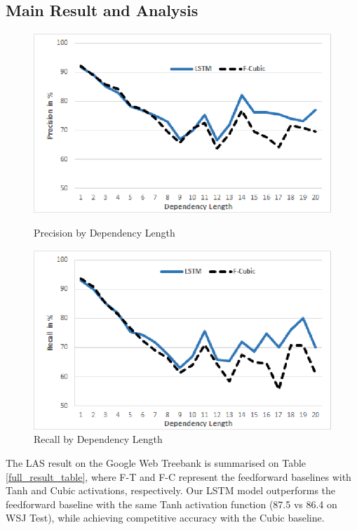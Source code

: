 \subsection{Main Result and Analysis}
\begin{figure}[t]
\centering
\begin{minipage}{\columnwidth}
  \centering
  \includegraphics[width=.9\columnwidth]{images/precision.eps}
  \caption{Precision by Dependency Length}
  \label{fig:precision}
\end{minipage}
\begin{minipage}{.95\columnwidth}
  \centering
  \includegraphics[width=.9\columnwidth]{images/recall.eps}
  \caption{Recall by Dependency Length}
  \label{fig:recall}
\end{minipage}
\end{figure}
The LAS result on the Google Web Treebank is summarised on Table \ref{full_result_table}, where F-T and F-C represent the feedforward baselines with Tanh and Cubic activations, respectively.
Our LSTM model outperforms the feedforward baseline with the same Tanh activation function (87.5 vs 86.4 on WSJ Test), while achieving competitive accuracy with the Cubic baseline. 

